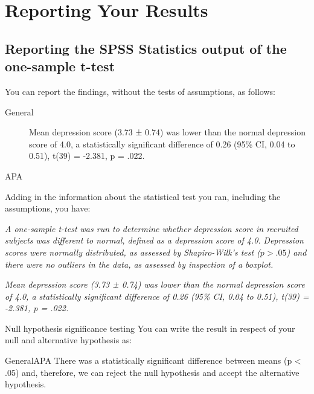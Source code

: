 \documentclass[]{article}
\begin{document}
\section{Reporting Your Results}
\subsection{Reporting the SPSS Statistics output of the one-sample t-test}
You can report the findings, without the tests of assumptions, as follows:
\begin{framed}
\begin{description}
\item[General]
Mean depression score (3.73 ± 0.74) was lower than the normal depression score of 4.0, a statistically significant difference of 0.26 (95\% CI, 0.04 to 0.51), t(39) = -2.381, p = .022.
\item[APA]
\end{description}
\end{framed}
Adding in the information about the statistical test you ran, including the assumptions, you have:

\begin{framed}
\noindent \textit{A one-sample t-test was run to determine whether depression score in recruited subjects was different to normal, defined as a depression score of 4.0.}
\textit{Depression scores were normally distributed, as assessed by Shapiro-Wilk's test ($p > .05$) and there were no outliers in the data, as assessed by inspection of a boxplot.}

\textit{Mean depression score (3.73 ± 0.74) was lower than the normal depression score of 4.0, a statistically significant difference of 0.26 (95\% CI, 0.04 to 0.51), t(39) = -2.381, p = .022.}
\end{framed}

Null hypothesis significance testing
You can write the result in respect of your null and alternative hypothesis as:

GeneralAPA
There was a statistically significant difference between means (p < .05) and, therefore, we can reject the null hypothesis and accept the alternative hypothesis.


\end{document}
